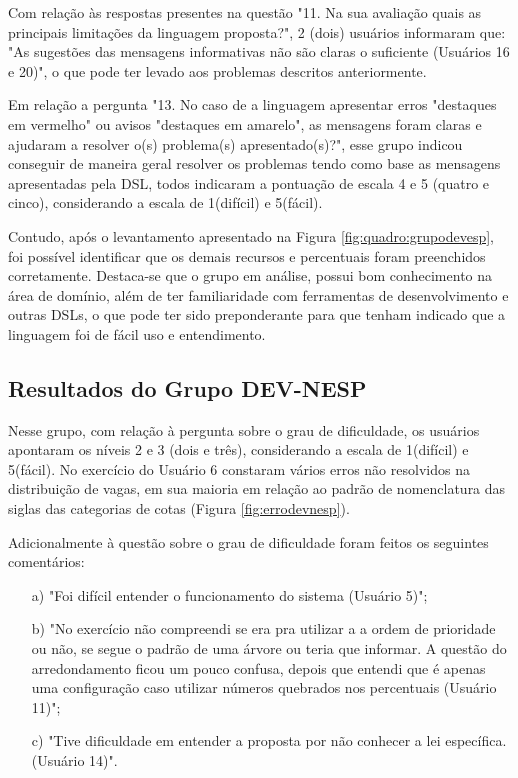 Com relação às respostas presentes na questão "11. Na sua avaliação quais as principais limitações da linguagem proposta?", 2 (dois) usuários informaram que: "As sugestões das mensagens informativas não são claras o suficiente (Usuários 16 e 20)", o que pode ter levado aos problemas descritos anteriormente.

Em relação a pergunta "13. No caso de a linguagem apresentar erros "destaques em vermelho" ou avisos "destaques em amarelo", as mensagens foram claras e ajudaram a resolver o(s) problema(s) apresentado(s)?", esse grupo indicou conseguir de maneira geral resolver os problemas tendo como base as mensagens apresentadas pela DSL, todos indicaram a pontuação de escala 4 e 5 (quatro e cinco), considerando a escala de 1(difícil) e 5(fácil).

Contudo, após o levantamento apresentado na Figura \ref{fig:quadro:grupodevesp}, foi possível identificar que os demais recursos e percentuais foram preenchidos corretamente. Destaca-se que o grupo em análise, possui bom conhecimento na área de domínio, além de ter familiaridade com ferramentas de desenvolvimento e outras \gls{DSL}s, o que pode ter sido preponderante para que tenham indicado que a linguagem foi de fácil uso e entendimento. 

\newpage
\subsection{Resultados do Grupo DEV-NESP}
\label{subsec:devnesp}

Nesse grupo, com relação à pergunta sobre o grau de dificuldade, os usuários apontaram os níveis 2 e 3 (dois e três), considerando a escala de 1(difícil) e 5(fácil). No exercício do Usuário 6 constaram vários erros não resolvidos na distribuição de vagas, em sua maioria em relação ao padrão de nomenclatura das siglas das categorias de cotas (Figura \ref{fig:errodevnesp}). 



\newpage


Adicionalmente à questão sobre o grau de dificuldade foram feitos os seguintes comentários:

\begin{enumerate}
    \item [a)] "Foi difícil entender o funcionamento do sistema (Usuário 5)";
    \item [b)] "No exercício não compreendi se era pra utilizar a a ordem de prioridade ou não, se segue o padrão de uma árvore ou teria que informar. A questão do arredondamento ficou um pouco confusa, depois que entendi que é apenas uma configuração caso utilizar números quebrados nos percentuais (Usuário 11)";
    \item [c)] "Tive dificuldade em entender a proposta por não conhecer a lei específica.  (Usuário 14)".    
\end{enumerate}

